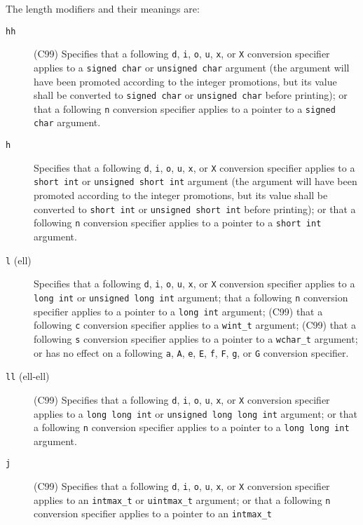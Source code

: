 The length modifiers and their meanings are:
\begin{description}
	\item[\texttt{hh}] (C99) Specifies that a following \texttt{d}, \texttt{i},
\texttt{o}, \texttt{u}, \texttt{x}, or \texttt{X} conversion specifier applies
to a \texttt{signed char} or \texttt{unsigned char} argument (the argument will
have been promoted according to the integer promotions, but its value shall be
converted to \texttt{signed char} or \texttt{unsigned char} before printing);
or that a following \texttt{n} conversion specifier applies to a pointer to a
\texttt{signed char} argument.
	\item[\texttt{h}] Specifies that a following \texttt{d}, \texttt{i},
\texttt{o}, \texttt{u}, \texttt{x}, or \texttt{X} conversion specifier applies
to a \texttt{short int} or \texttt{unsigned short int} argument (the argument
will have been promoted according to the integer promotions, but its value
shall be converted to \texttt{short int} or \texttt{unsigned short int} before
printing); or that a following \texttt{n} conversion specifier applies to a
pointer to a \texttt{short int} argument.
	\item[\texttt{l} (ell)] Specifies that a following \texttt{d}, \texttt{i},
\texttt{o}, \texttt{u}, \texttt{x}, or \texttt{X} conversion specifier applies
to a \texttt{long int} or \texttt{unsigned long int} argument; that a following
\texttt{n} conversion specifier applies to a pointer to a \texttt{long int}
argument; (C99) that a following \texttt{c} conversion specifier applies to a
\texttt{wint\_t} argument; (C99) that a following \texttt{s} conversion
specifier applies to a pointer to a \texttt{wchar\_t} argument; or has no
effect on a following \texttt{a}, \texttt{A}, \texttt{e}, \texttt{E},
\texttt{f}, \texttt{F}, \texttt{g}, or \texttt{G} conversion specifier.
	\item[\texttt{ll} (ell-ell)] (C99) Specifies that a following \texttt{d},
\texttt{i}, \texttt{o}, \texttt{u}, \texttt{x}, or \texttt{X} conversion
specifier applies to a \texttt{long long int} or \texttt{unsigned long long
int} argument; or that a following \texttt{n} conversion specifier applies to a
pointer to a \texttt{long long int} argument.
	\item[\texttt{j}] (C99) Specifies that a following \texttt{d}, \texttt{i},
\texttt{o}, \texttt{u}, \texttt{x}, or \texttt{X} conversion specifier applies
to an \texttt{intmax\_t} or \texttt{uintmax\_t} argument; or that a following
\texttt{n} conversion specifier applies to a pointer to an \texttt{intmax\_t}

\end{description}
